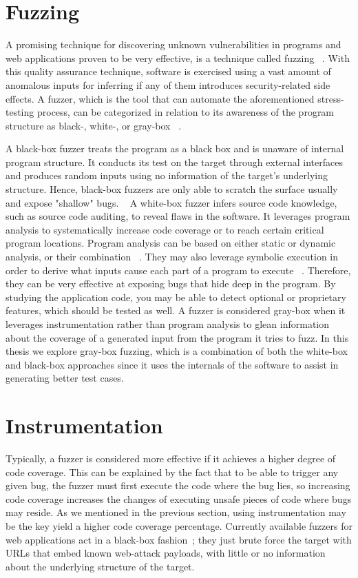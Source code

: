 \section{Fuzzing}
A promising technique for discovering unknown vulnerabilities in
programs and web applications proven to be very effective, is a technique called fuzzing ~\cite{fuzzing_def}.
With this quality assurance technique, software is exercised using a vast amount of anomalous inputs for inferring if any of them introduces security-related side effects. A fuzzer, which is the tool that can automate the aforementioned stress-testing process, can be categorized in relation to its awareness of the program structure as black-, white-, or gray-box ~\cite{fuzzing_book}. 

A black-box fuzzer treats the program as a black box and is unaware of
internal program structure. It conducts its test on the target through external
interfaces and produces random inputs using no information of the target's underlying structure. Hence,  black-box fuzzers are only able to scratch the surface usually and expose "shallow" bugs. ~\cite{fuzzing_owasp}
A white-box fuzzer infers source code knowledge, such as source code auditing, to reveal
flaws in the software. It leverages program analysis to systematically
increase code coverage or to reach certain critical program locations. Program analysis can be based on either static or dynamic analysis, or their combination ~\cite{program_analysis_book}. They may also leverage symbolic execution in order to derive what inputs cause each part of a program to execute ~\cite{symbolic_exe}. Therefore, they can be very effective at exposing bugs that hide deep in the program. By studying the application code, you may be able to detect optional or proprietary features, which should be tested as well.
A fuzzer is considered gray-box when it leverages instrumentation rather than program analysis to glean information about the coverage of a generated input from the program it tries to fuzz. In this thesis we explore gray-box fuzzing, which is a combination of both the white-box and black-box approaches since it uses the internals of the software to assist in generating better test cases.

\section{Instrumentation}
Typically, a fuzzer is considered more effective if it achieves a higher degree of code coverage. This can be explained by the fact that to be able to trigger any given bug, the fuzzer must first execute the code where the bug lies, so increasing code coverage increases the changes of executing unsafe pieces of code where bugs may reside. As we mentioned in the previous section, using instrumentation may be the key yield a higher code coverage percentage.
Currently available fuzzers for web applications act in a black-box fashion~\cite{doupe2010johnny}; they just brute force the target with URLs that embed known web-attack payloads, with little or no information about the underlying structure of the target. 

